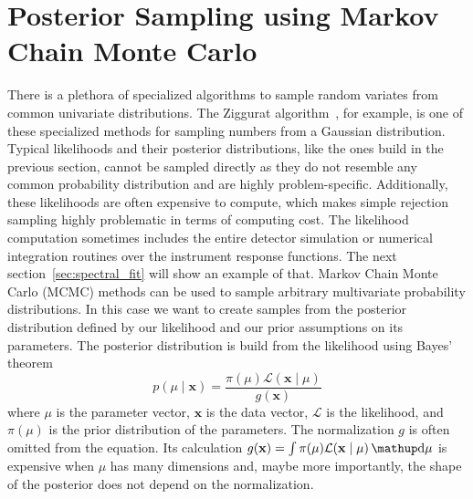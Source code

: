 \section{Posterior Sampling using Markov Chain Monte Carlo}
\label{sec:mcmc}
There is a plethora of specialized algorithms to sample random variates from common univariate distributions. 
The Ziggurat algorithm~\cite{zigurat}, for example, is one of these specialized methods
for sampling numbers from a Gaussian distribution.  
Typical likelihoods and their posterior distributions, like the ones build in the previous section, cannot be sampled directly as they 
do not resemble any common probability distribution and are highly problem-specific. 
Additionally, these likelihoods are often expensive to compute, which makes simple rejection sampling highly problematic in terms of 
computing cost. The likelihood computation sometimes includes the entire detector simulation or numerical integration routines 
over the instrument response functions. The next section~\ref{sec:spectral_fit} will show an example of that. 
Markov Chain Monte Carlo (MCMC) methods can be used to sample arbitrary multivariate probability distributions.
In this case we want to create samples from the posterior distribution defined by our likelihood and our prior assumptions on its parameters.
The posterior distribution is build from the likelihood using Bayes' theorem  
\begin{equation*}
  p(\mu \mid \mathbf{x}) = \frac{\pi(\mu) \mathcal{L}(\mathbf{x}\mid \mu)}{g(\mathbf{x})}
\end{equation*}
where $\mu$ is the parameter vector, $\mathbf{x}$ is the data vector, $\mathcal{L}$ is the likelihood, and $\pi(\mu)$ is the prior distribution of the parameters.
The normalization $g$ is often omitted from the equation. Its calculation $g(\mathbf{x}) = \int \pi(\mu) \mathcal{L}(\mathbf{x}\mid \mu) \diff{\mu}$ is expensive when 
$\mu$ has many dimensions and, maybe more importantly, the shape of the posterior does not depend on the normalization. 

